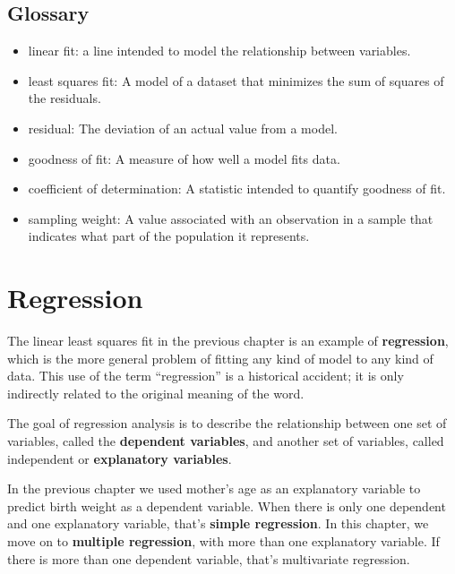 \documentclass[12pt]{book}
\begin{document}
\section{Glossary}

\begin{itemize}

\item linear fit: a line intended to model the relationship between
variables.  

\item least squares fit: A model of a dataset that minimizes the
sum of squares of the residuals.

\item residual: The deviation of an actual value from a model.

\item goodness of fit: A measure of how well a model fits data.

\item coefficient of determination: A statistic intended to
quantify goodness of fit.

\item sampling weight: A value associated with an observation in a
  sample that indicates what part of the population it represents.

\end{itemize}



\chapter{Regression}
\label{regression}

The linear least squares fit in the previous chapter is an example of
{\bf regression}, which is the more general problem of fitting any
kind of model to any kind of data.  This use of the term ``regression''
is a historical accident; it is only indirectly related to the
original meaning of the word.

The goal of regression analysis is to describe the relationship
between one set of variables, called the {\bf dependent variables},
and another set of variables, called independent or {\bf
  explanatory variables}.

In the previous chapter we used mother's age as an explanatory
variable to predict birth weight as a dependent variable.  When there
is only one dependent and one explanatory variable, that's {\bf
  simple regression}.  In this chapter, we move on to {\bf multiple
  regression}, with more than one explanatory variable.  If there is
more than one dependent variable, that's multivariate
regression.
\end{document}

